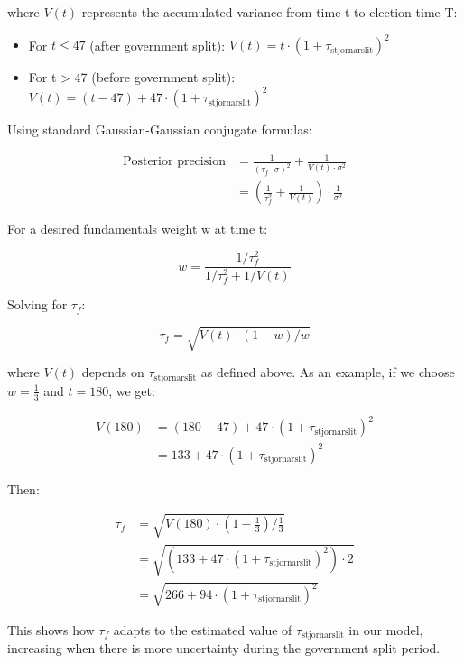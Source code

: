 \documentclass[
  letterpaper,
  DIV=11,
  numbers=noendperiod]{scrartcl}
\providecommand{\tightlist}{%
  \setlength{\itemsep}{0pt}\setlength{\parskip}{0pt}}\usepackage{longtable,booktabs,array}
\begin{document}
where \(V(t)\) represents the accumulated variance from time t to
election time T:

\begin{itemize}
\tightlist
\item
  For \(t \leq 47\) (after government split):
  \(V(t) = t \cdot (1 + \tau_{\text{stjornarslit}})^2\)
\item
  For t \textgreater{} 47 (before government split):
  \(V(t) = (t - 47) + 47 \cdot (1 + \tau_{\text{stjornarslit}})^2\)
\end{itemize}

Using standard Gaussian-Gaussian conjugate formulas:

\[
\begin{aligned}
\text{Posterior precision} &= \frac{1}{(\tau_f \cdot \sigma)^2} + \frac{1}{V(t) \cdot \sigma^2} \\
&= \left(\frac{1}{\tau_f^2} + \frac{1}{V(t)}\right) \cdot \frac{1}{\sigma^2}
\end{aligned}
\]

For a desired fundamentals weight w at time t:

\[
w = \frac{1/\tau_f^2}{1/\tau_f^2 + 1/V(t)}
\]

Solving for \(\tau_f\):

\[
\tau_f = \sqrt{V(t) \cdot (1-w)/w}
\]

where \(V(t)\) depends on \(\tau_{\text{stjornarslit}}\) as defined
above. As an example, if we choose \(w = \frac13\) and \(t = 180\), we
get:

\[
\begin{aligned}
V(180) &= (180 - 47) + 47 \cdot (1 + \tau_{\text{stjornarslit}})^2 \\
&= 133 + 47 \cdot (1 + \tau_{\text{stjornarslit}})^2
\end{aligned}
\]

Then:

\[
\begin{aligned}
\tau_f &= \sqrt{V(180) \cdot (1-\frac{1}{3})/\frac{1}{3}} \\
&= \sqrt{(133 + 47 \cdot (1 + \tau_{\text{stjornarslit}})^2) \cdot 2} \\
&= \sqrt{266 + 94 \cdot (1 + \tau_{\text{stjornarslit}})^2}
\end{aligned}
\]

This shows how \(\tau_f\) adapts to the estimated value of
\(\tau_{\text{stjornarslit}}\) in our model, increasing when there is
more uncertainty during the government split period.
\end{document}

